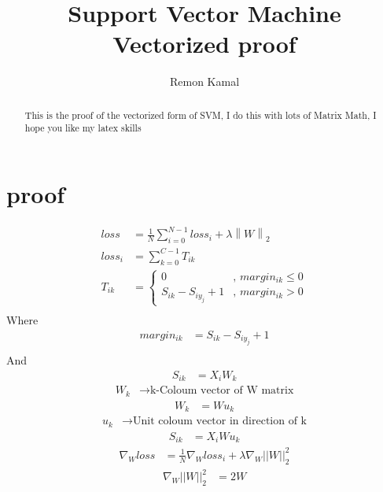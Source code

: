 \documentclass[]{article}
\title{Support Vector Machine Vectorized proof}
\author{Remon Kamal}
\begin{document}
\maketitle

\begin{abstract}

This is the proof of the vectorized form of SVM, I do this with
lots of Matrix Math, I hope you like my latex skills

\end{abstract}

\section{proof}

\begin{align}
	loss &= \frac{1}{N} \sum_{i=0}^{N-1} loss_i + \lambda \left\lVert W \right\rVert_2 \label{eq:1} \\
	loss_i &= \sum_{k=0}^{C-1} T_{ik} \label {eq:2} \\
	T_{ik} &= \begin{cases}
	0 & \text{, $margin_{ik} \le 0$} \\
	S_{ik} - S_{i y_j} + 1 & \text{, $margin_{ik} > 0$}
	\end{cases} \label{eq:3} \\
\end{align}
Where  
\begin{align}
	margin_{ik} &= S_{ik} - S_{i y_j} + 1 \label{eq:4} \\
\end{align}
And  
\begin{align}
	S_{ik} &= X_{i} W_{k} \label{eq:5}
\end{align}
\begin{align}
	W_{k}  & \rightarrow \text{k-Coloum vector of W matrix} \label{eq:6}
\end{align}
\begin{align}
	W_{k} &= W u_{k}
\end{align}
\begin{align}
	u_{k} & \rightarrow \text{Unit coloum vector in direction of k}
\end{align}
\begin{align}
	S_{ik} &= X_{i} W u_{k}
\end{align}
\begin{align}
	\nabla_W loss &= \frac{1}{N} \nabla_W loss_i + \lambda \nabla_W ||W||_{2}^{2}
\end{align}
\begin{align}
	\nabla_W ||W||_{2}^{2} &= 2 W
\end{align}
\end{document}
